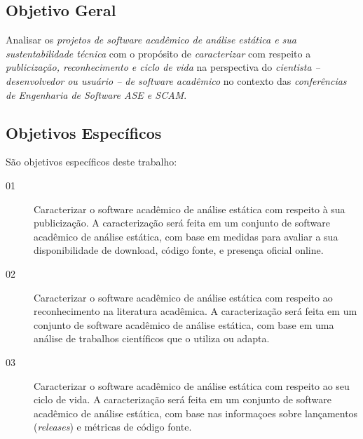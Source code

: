 \subsection{Objetivo Geral}

Analisar os \textit{projetos de software acadêmico de análise estática e sua sustentabilidade técnica} %
com o propósito de \textit{caracterizar} %
com respeito a \textit{publicização, reconhecimento e ciclo de vida} %
na perspectiva do \textit{cientista -- desenvolvedor ou usuário -- de software acadêmico} %
no contexto das \textit{conferências de Engenharia de Software ASE e SCAM}. %

%

\subsection{Objetivos Específicos}

São objetivos específicos deste trabalho:


\begin{description}
  \item [01]
    Caracterizar o software acadêmico de análise estática com respeito à sua
    publicização.
    A caracterização será feita em um conjunto de software acadêmico de análise
    estática, com base em medidas para avaliar a sua disponibilidade de
    download, código fonte, e presença oficial online.
  \item [02]
    Caracterizar o software acadêmico de análise estática com respeito ao
    reconhecimento na literatura acadêmica.
    A caracterização será feita em um conjunto de software acadêmico de análise
    estática, com base em uma análise de trabalhos científicos que o utiliza ou
    adapta.
  \item [03]
    Caracterizar o software acadêmico de análise estática com respeito ao
    seu ciclo de vida.
    A caracterização será feita em um conjunto de software acadêmico de análise
    estática, com base nas informaçoes sobre lançamentos ({\it releases}) e métricas de código
    fonte.
\end{description}

